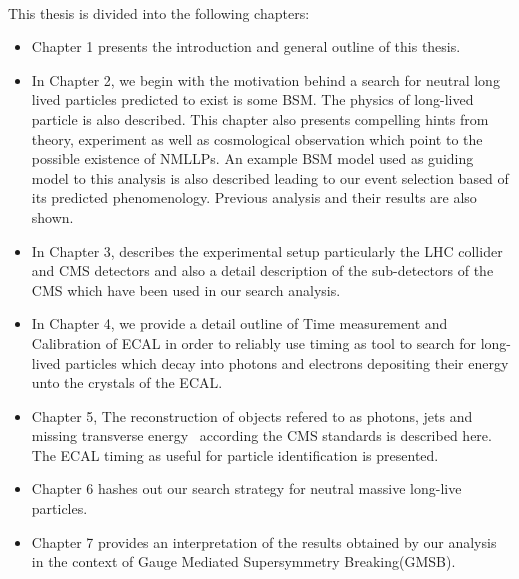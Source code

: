 \paragraph*{}
This thesis is divided into the following chapters:
\begin{itemize}
\item Chapter 1 presents the introduction and general outline of this thesis. 

\item In Chapter 2, we begin with the motivation behind a search for neutral long lived particles predicted to exist is some BSM.
The physics of long-lived particle is also described.
This chapter also presents compelling  hints from theory, experiment as well as cosmological observation which point to the possible existence of NMLLPs.
An example BSM model used as guiding model to this analysis is also described leading to our event selection based of its predicted phenomenology. 
Previous analysis and their results are also shown. 

\item  In Chapter 3,  describes the experimental setup particularly the LHC collider and CMS detectors and also a
detail description of the sub-detectors of the CMS which have been used in our search analysis.

\item In Chapter 4, we provide a detail outline of Time measurement and Calibration of ECAL in order to 
reliably use timing as tool to search for long-lived particles which decay into photons and electrons depositing their energy unto the crystals of the ECAL.
\item Chapter 5,
The reconstruction of objects refered to as photons, jets and missing transverse energy ~\MET according the CMS standards is described here. The ECAL timing as useful for particle identification is presented.

\item Chapter 6  hashes out our search strategy for neutral massive long-live particles. 

\item Chapter 7 provides an interpretation of the results obtained by our analysis  in the context of Gauge Mediated Supersymmetry Breaking(GMSB).


\end{itemize}
